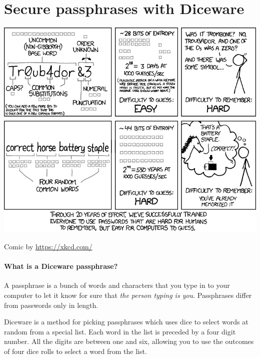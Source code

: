 \chapter*{Secure passphrases with Diceware}
\label{ch:diceware}

\vspace{-.2in}
\includegraphics[width=\textwidth]{password_strength.png}

\vspace{-.125in}
\begin{tiny}
	\begin{center}
		Comic by \url{https://xkcd.com/} \ccbync 
	\end{center}
\end{tiny}

\newpage
\setlength{\parindent}{0em}
\setlength{\parskip}{0.5em}

\subsubsection*{What is a Diceware passphrase?}

A passphrase is a bunch of words and characters that you type in to your computer to let it know for sure that \textit{the person typing is you}. Passphrases differ from passwords only in length.

Diceware is a method for picking passphrases which uses dice to select words at random from a special list. Each word in the list is preceded by a four digit number. All the digits are between one and six, allowing you to use the outcomes of four dice rolls to select a word from the list.

